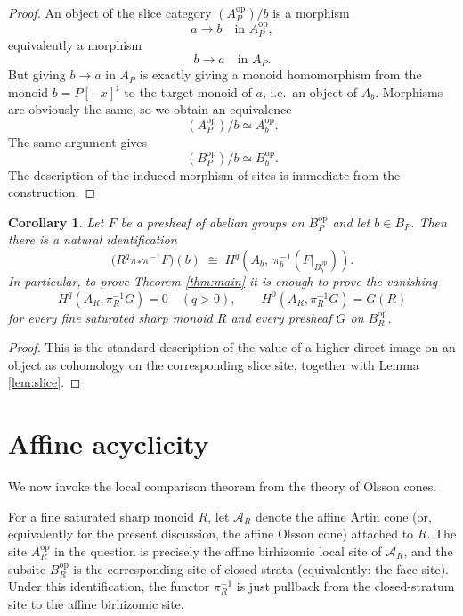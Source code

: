\documentclass[11pt]{article}
\newtheorem{corollary}[theorem]{Corollary}
\theoremstyle{remark}
\begin{document}
\begin{proof}
An object of the slice category $(A_P^{\mathrm{op}})/b$ is a morphism
\[
a\longrightarrow b
\quad\text{in }A_P^{\mathrm{op}},
\]
equivalently a morphism
\[
b\longrightarrow a
\quad\text{in }A_P.
\]
But giving $b\to a$ in $A_P$ is exactly giving a monoid homomorphism from the monoid
$b=P[-x]^\sharp$ to the target monoid of $a$, i.e.\ an object of $A_b$.
Morphisms are obviously the same, so we obtain an equivalence
\[
(A_P^{\mathrm{op}})/b \simeq A_b^{\mathrm{op}}.
\]
The same argument gives
\[
(B_P^{\mathrm{op}})/b \simeq B_b^{\mathrm{op}}.
\]
The description of the induced morphism of sites is immediate from the construction.
\end{proof}

\begin{corollary}\label{cor:objectwise}
Let $F$ be a presheaf of abelian groups on $B_P^{\mathrm{op}}$ and let
$b\in B_P$.  Then there is a natural identification
\[
\bigl(R^q\pi_*\pi^{-1}F\bigr)(b)
\;\cong\;
H^q\!\left(A_b,\ \pi_b^{-1}(F|_{B_b^{\mathrm{op}}})\right).
\]
In particular, to prove Theorem \ref{thm:main} it is enough to prove the vanishing
\[
H^q\!\left(A_R,\pi_R^{-1}G\right)=0\quad(q>0),
\qquad
H^0\!\left(A_R,\pi_R^{-1}G\right)=G(R)
\]
for every fine saturated sharp monoid $R$ and every presheaf $G$ on $B_R^{\mathrm{op}}$.
\end{corollary}

\begin{proof}
This is the standard description of the value of a higher direct image on an object
as cohomology on the corresponding slice site, together with Lemma \ref{lem:slice}.
\end{proof}

\section{Affine acyclicity}

We now invoke the local comparison theorem from the theory of Olsson cones.

For a fine saturated sharp monoid $R$, let $\mathscr A_R$ denote the affine Artin cone
(or, equivalently for the present discussion, the affine Olsson cone) attached to $R$.
The site $A_R^{\mathrm{op}}$ in the question is precisely the affine birhizomic local site
of $\mathscr A_R$, and the subsite $B_R^{\mathrm{op}}$ is the corresponding site of
closed strata (equivalently: the face site).
Under this identification, the functor $\pi_R^{-1}$ is just pullback from the closed-stratum
site to the affine birhizomic site.
\end{document}
